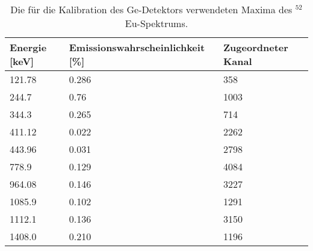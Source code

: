 \begin{table}[htp]
    \centering
    \caption{
        Die für die Kalibration des Ge-Detektors verwendeten Maxima des $^{52}$Eu-Spektrums.
    }
    \label{tab:maxima}
    \begin{tabular}{lll}
        \toprule
        Energie [\si{keV}] & Emissionswahrscheinlichkeit [\si{\percent}] & Zugeordneter Kanal \\
        \midrule
        \num{121.78} & \num{0.286} & \num{ 358} \\
        \num{244.7 } & \num{ 0.76} & \num{1003} \\
        \num{344.3 } & \num{0.265} & \num{ 714} \\
        \num{411.12} & \num{0.022} & \num{2262} \\
        \num{443.96} & \num{0.031} & \num{2798} \\
        \num{778.9 } & \num{0.129} & \num{4084} \\
        \num{964.08} & \num{0.146} & \num{3227} \\
        \num{1085.9} & \num{0.102} & \num{1291} \\
        \num{1112.1} & \num{0.136} & \num{3150} \\
        \num{1408.0} & \num{0.210} & \num{1196} \\
        \bottomrule
    \end{tabular}
\end{table}

